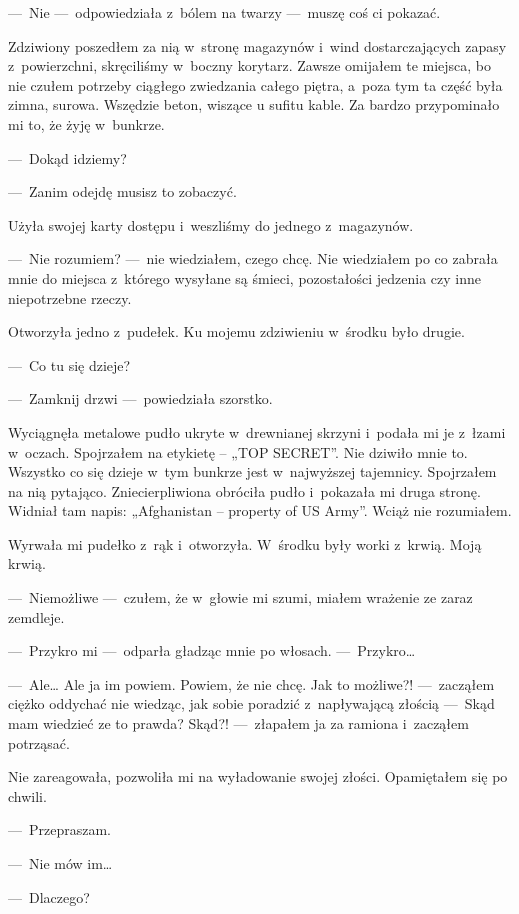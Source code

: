 ---~Nie ---~odpowiedziała z~bólem na twarzy ---~muszę coś ci pokazać.

Zdziwiony poszedłem za nią w~stronę magazynów i~wind dostarczających zapasy z~powierzchni, skręciliśmy w~boczny 
korytarz. Zawsze omijałem te miejsca, bo nie czułem potrzeby ciągłego zwiedzania całego piętra, a~poza tym ta część 
była zimna, surowa. Wszędzie beton, wiszące u sufitu kable. Za bardzo przypominało mi to, że żyję w~bunkrze. 

---~Dokąd idziemy? 

---~Zanim odejdę musisz to zobaczyć.

Użyła swojej karty dostępu i~weszliśmy do jednego z~magazynów. 

\paraSep

---~Nie rozumiem? ---~nie wiedziałem, czego chcę. Nie wiedziałem po co zabrała mnie do miejsca z~którego wysyłane są 
śmieci, pozostałości jedzenia czy inne niepotrzebne rzeczy. 

Otworzyła jedno z~pudełek. Ku mojemu zdziwieniu w~środku było drugie.

---~Co tu się dzieje? 

---~Zamknij drzwi ---~powiedziała szorstko.

Wyciągnęła metalowe pudło ukryte w~drewnianej skrzyni i~podała mi je z~łzami w~oczach. Spojrzałem na etykietę – „TOP 
SECRET”. Nie dziwiło mnie to. Wszystko co się dzieje w~tym bunkrze jest w~najwyższej tajemnicy. Spojrzałem na nią 
pytająco. Zniecierpliwiona obróciła pudło i~pokazała mi druga stronę. 
Widniał tam napis: „Afghanistan -- property of US Army”. Wciąż nie rozumiałem. 

Wyrwała mi pudełko z~rąk i~otworzyła. W~środku były worki z~krwią. Moją krwią. 

---~Niemożliwe ---~czułem, że w~głowie mi szumi, miałem wrażenie ze zaraz zemdleje.

---~Przykro mi ---~odparła gładząc mnie po włosach. ---~Przykro…

---~Ale… Ale ja im powiem. Powiem, że nie chcę. Jak to możliwe?! ---~zacząłem ciężko oddychać nie wiedząc, jak sobie 
poradzić z~napływającą złością ---~Skąd mam wiedzieć ze to prawda? Skąd?! ---~złapałem ja za ramiona i~zacząłem 
potrząsać. 

Nie zareagowała, pozwoliła mi na wyładowanie swojej złości. Opamiętałem się po chwili.

---~Przepraszam.

---~Nie mów im…

---~Dlaczego?

